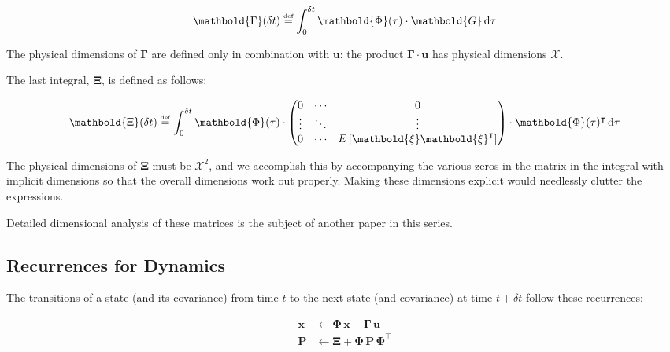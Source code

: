 \documentclass[10pt,oneside,x11names]{article}
\begin{document}
\begin{equation}
\label{eqn:definition-of-Gamma}
\mathbold{\Gamma}(\delta t)\stackrel{\text{\tiny def}}{=}
\int_{0}^{\delta t}{\mathbold{\Phi}(\tau) \cdot \mathbold{G}\,\textrm{d}\tau } 
\end{equation}

\noindent The physical dimensions of \(\mathbold{\Gamma}\) are defined only in
combination with \(\mathbold{u}\): the product \(\mathbold{\Gamma}\cdot\mathbold{u}\)
has physical dimensions \(\mathcal{X}\). 

The last integral, \(\mathbold{\Xi}\), is defined as follows:

\begin{equation}
\label{eqn:definition-of-Xi}
\mathbold{\Xi}(\delta t)\stackrel{\text{\tiny def}}{=}
\int_{0}^{\delta t}\mathbold{\Phi}(\tau)\cdot{
\begin{pmatrix}
      0 & \cdots  &       0 \\
\vdots  & \ddots  & \vdots  \\ 
      0 & \cdots  & E\left[\mathbold{ \xi  }\mathbold{ \xi  }^{ \intercal  }\right] 
\end{pmatrix}\cdot\mathbold{\Phi}(\tau)^\intercal\,\textrm{d}\tau}
\end{equation}

\noindent The physical dimensions of \(\mathbold{\Xi}\) must be \(\mathcal{X}^2\), and we
accomplish this by accompanying the various zeros in the matrix in the integral
with implicit dimensions so that the overall dimensions work out properly.
Making these dimensions explicit would needlessly clutter the expressions.

Detailed dimensional analysis of these matrices is the subject of another paper
in this series.

\subsection{Recurrences for Dynamics}
\label{sec:orgheadline4}

The transitions of a state (and its covariance) from time \(t\) to the next state
(and covariance) at time
\(t+\delta t\) follow these recurrences:

\begin{align}
\label{eqn:transition-of-state}
\mathbold{x}
&\leftarrow
\mathbold{\Phi}\,
\mathbold{x}+
\mathbold{\Gamma}\,
\mathbold{u} \\
\mathbold{P}
&\leftarrow
\mathbold{\Xi}+
\mathbold{\Phi}\,
\mathbold{P}\,
\mathbold{\Phi}^\intercal
\end{align}
\end{document}

